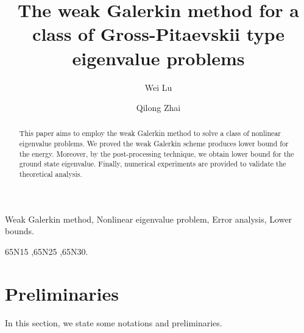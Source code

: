 \documentclass[compress, preprint,9pt]{elsarticle}
\numberwithin{equation}{section}
\begin{document}
\begin{frontmatter}

\title{
	The weak Galerkin method for a class of Gross-Pitaevskii type eigenvalue problems
	}

\author[mymainaddress]{Wei Lu}


\author[mymainaddress]{Qilong Zhai}

\address[mymainaddress]{School of Mathematics, Jilin University, Changchun 130012, Jilin, China} 
\address[mysecondaddress]{LSEC and Institute of Computational
	Mathematics and Scientific/Engineering Computing, Academy of
	Mathematics and Systems Science, Chinese Academy of Sciences,
	Beijing 100190, China}
\begin{abstract}
	This paper aims to employ the weak Galerkin method to solve a class of nonlinear eigenvalue problems. We proved the weak Galerkin scheme produces lower bound for the energy. Moreover, by the post-processing technique, we obtain lower bound for the ground state eigenvalue. Finally, numerical experiments are provided to validate the theoretical analysis.
\end{abstract}



\begin{keyword}
 


Weak Galerkin method, Nonlinear eigenvalue problem, Error analysis, Lower bounds.

\MSC[2008] 65N15 \sep 65N25 \sep 65N30.

\end{keyword}

\end{frontmatter}



\section{Preliminaries}In this section, we state some notations and preliminaries. 
\end{document}
